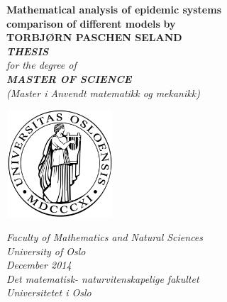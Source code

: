 \documentclass[11pt, a4paper]{scrartcl}
\begin{document}
\thispagestyle{empty}
\begin{center}        %
  \vspace{5mm}          %
  \LARGE
  \textbf{Mathematical analysis of epidemic systems \\ comparison of different models}
  \Large
  \vspace{5mm}
  \textbf{by} \\
  \vspace{5mm}
  \large
  \textbf{TORBJØRN PASCHEN SELAND} \\
  \vspace{30mm}
  \Large
  {\bf{\textsl{THESIS}}} \\
  \textsl{for the degree of} \\
  \vspace{2mm}
  {\bf{\textsl{MASTER OF SCIENCE}}} \\
  \vspace{5mm}
  {\large \textsl {(Master i Anvendt matematikk og mekanikk)}}\\
  \vspace{10mm}
  \centerline{\includegraphics[width=4cm,height=4cm]{uiologo.png}}
  \vspace{5mm}
  \textsl{Faculty of Mathematics and Natural Sciences} \\
  \textsl{University of Oslo} \\
  \vspace{10mm}
  \large
  \textsl{December 2014} \\
  \vspace{5mm}
  \normalsize
  \textsl{Det matematisk- naturvitenskapelige fakultet} \\
  \textsl{Universitetet i Oslo} \\
\end{center}
\end{document}
